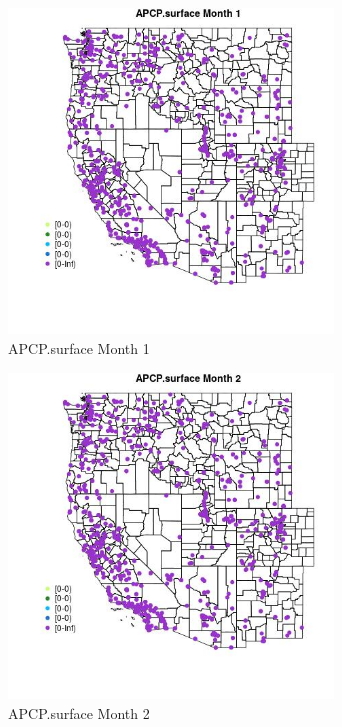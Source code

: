 \begin{figure} 
\centering  
\includegraphics[width=0.77\textwidth]{Code_Outputs/Report_ML_input_PM25_Step4_part_e_de_duplicated_aves_compiled_2019-05-21wNAs_MapObsMo1APCPsurface.jpg} 
\caption{\label{fig:Report_ML_input_PM25_Step4_part_e_de_duplicated_aves_compiled_2019-05-21wNAsMapObsMo1APCPsurface}APCP.surface Month 1} 
\end{figure} 
 

\begin{figure} 
\centering  
\includegraphics[width=0.77\textwidth]{Code_Outputs/Report_ML_input_PM25_Step4_part_e_de_duplicated_aves_compiled_2019-05-21wNAs_MapObsMo2APCPsurface.jpg} 
\caption{\label{fig:Report_ML_input_PM25_Step4_part_e_de_duplicated_aves_compiled_2019-05-21wNAsMapObsMo2APCPsurface}APCP.surface Month 2} 
\end{figure} 
 

